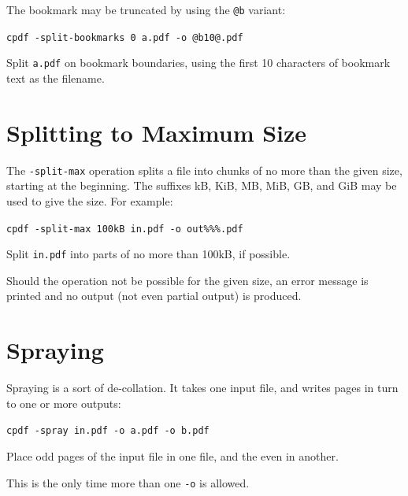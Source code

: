 \documentclass{book}
\begin{document}
\noindent The bookmark may be truncated by using the \texttt{@b} variant:

  \begin{framed}\small
    \noindent\verb!cpdf -split-bookmarks 0 a.pdf -o @b10@.pdf!

    \vspace{2.5mm}
    \noindent Split \texttt{a.pdf} on bookmark boundaries, using the first 10 characters of bookmark text as the filename.

  \end{framed}

\section{Splitting to Maximum Size}

The \texttt{-split-max} operation splits a file into chunks of no more than the given size, starting at the beginning. The suffixes kB, KiB, MB, MiB, GB, and GiB may be used to give the size. For example:

  \begin{framed}\small
    \noindent\verb!cpdf -split-max 100kB in.pdf -o out%%%.pdf!

    \vspace{2.5mm}
    \noindent Split \texttt{in.pdf} into parts of no more than 100kB, if possible.

  \end{framed}

\noindent Should the operation not be possible for the given size, an error message is printed and no output (not even partial output) is produced.

\section{Spraying}

Spraying is a sort of de-collation. It takes one input file, and writes pages in turn to one or more outputs:

  \begin{framed}\small
    \noindent\verb!cpdf -spray in.pdf -o a.pdf -o b.pdf!

    \vspace{2.5mm}
    \noindent Place odd pages of the input file in one file, and the even in another.

  \end{framed}

\noindent This is the only time more than one \texttt{-o} is allowed.
\end{document}

